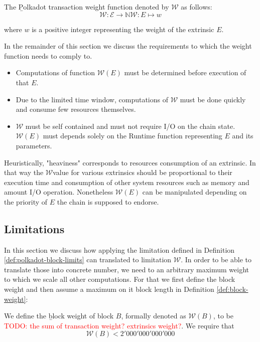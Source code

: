 \documentclass[11pt,a4paper]{article}
\newcommand{\todo}[1]{\textcolor{red}{TODO: #1}}
\newcommand{\TWF}{\ensuremath{\mathcal{W}}}
\begin{document}
\begin{definition}
  \label{defn:weight-function}
  The {\b Polkadot transaction weight function} denoted by $\mathcal{W}$ as follows:
  \[
  \mathcal{W}: \mathcal{E}\rightarrow \mathbb{N}
  \mathcal{W}: E \mapsto w
  \]

  where $w$ is a positive integer representing the weight of the extrinsic $E$.
  
\end{definition}

In the remainder of this section we discuss the requirements to which the weight function needs to comply to.

\begin{itemize}

\item Computations of function $\mathcal{W}(E)$  must be determined before execution of that $E$.

\item Due to the limited time window, computations of $\TWF$ must be done quickly and consume
      few resources themselves.
\item $\TWF$ must be self contained and must not require I/O on the chain state. $\TWF(E)$
must depends solely on the Runtime function representing $E$ and its parameters.

\end{itemize}

Heuristically, "heaviness" corresponds to resources consumption of an extrinsic. In that way the \TWF value for various extrinsics should be proportional to their execution time and consumption of other system resources such as memory and amount I/O operation. Nonetheless $\TWF(E)$ can be manipulated depending on the priority of $E$ the chain is supposed to endorse.

\subsection{Limitations}\label{sec:limitations}
In this section we discuss how applying the limitation defined in Definition \ref{def:polkadot-block-limits} can translated to limitation $\TWF$. In order to be able to translate those into concrete number, we need to an arbitrary maximum weight to which we scale all other computations. For that we first define the block weight and then assume  a maximum on it block length in Definition \ref{def:block-weight}:

\begin{definition}
  \label{def:block-weight} We define the {\b block weight} of block $B$, formally denoted as  $\TWF(B)$, to be \todo{the sum of transaction weight? extrinsics weight?}. 
  We require that
  \[
\TWF(B) < 2'000'000'000'000
\]

\end{definition}
\end{document}
